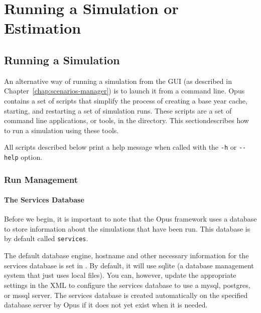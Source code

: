 
\chapter{Running a Simulation or Estimation}
\label{part:running-simulation}
%
\section{Running a Simulation}

An alternative way of running a simulation from the GUI (as described
in Chapter~\ref{chap:scenarios-manager}) is to launch it from a command
line. Opus contains a set of scripts that simplify the process of
creating a base year cache, starting, and restarting a set of
simulation runs. These scripts are a set of command line applications,
or tools, in the  directory. This sectiondescribes how to run a simulation using these tools. 

All scripts described below print a help message when called with the
\verb|-h| or \verb|--help| option.

% 
\subsection{Run Management}
\label{sec:run-manager}

\subsubsection{The Services Database}

Before we begin, it is important to note that the Opus framework uses a
database to store information about the simulations that have been
run. This database is by default called \verb|services|. 

The default database engine, hostname and other necessary information
for the services database is set in
. By default,
it will use sqlite (a database management system that just uses local
files). You can, however, update the appropriate settings in the XML
to configure the services database to use a mysql, postgres, or mssql
server. The services database is created automatically on the
specified database server by Opus if it does not yet exist when it is needed.
